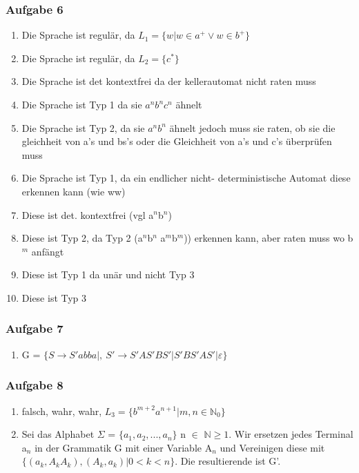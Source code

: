 \documentclass[12pt]{scrartcl}
\begin{document}
\subsubsection{Aufgabe 6}
	\begin{enumerate}
	
		\item Die Sprache ist regulär, da \(L_1 = \{w | w \in a^{+} \lor w \in b^{+} \} \)
		\item Die Sprache ist regulär, da \( L_2 = \{c^{*} \} \)
		\item Die Sprache ist det kontextfrei da der kellerautomat nicht raten muss 
		\item Die Sprache ist Typ 1 da sie \( a^{n} b^{n} c^{n} \) ähnelt
		\item Die Sprache ist Typ 2, da sie \(a^{n} b^{n} \) ähnelt jedoch muss sie raten, ob sie die gleichheit von a's und  bs's oder die Gleichheit von a's und c's überprüfen muss
		\item Die Sprache ist Typ 1, da ein endlicher nicht- deterministische Automat diese erkennen kann (wie ww)
		\item Diese ist det. kontextfrei (vgl a$^{n}$b$^{n}$)
		\item Diese ist Typ 2, da Typ 2 (a$^{n}$b$^{n}$ a$^{m}$b$^{m}$)) erkennen kann, aber raten muss wo b$^{m}$ anfängt
		\item Diese ist Typ 1 da unär und nicht Typ 3
		\item Diese ist Typ 3
	\end{enumerate}

\subsubsection{Aufgabe 7}
	\begin{enumerate}
		\item G = \(\{S \rightarrow S'abba | ,\ S' \rightarrow S'AS'BS'| S'BS'AS'|\varepsilon \}\)
	\end{enumerate}

\subsubsection{Aufgabe 8}
	\begin{enumerate}
		\item falsch, wahr, wahr, \(L_3=\{ b^{m+2} a^{n+1}| m,n \in \mathbb{N}_0 \}  \)
		\item Sei das Alphabet $\Sigma$ = \(\{a_1, a_2, ..., a_n  \}\) n $\in$ $\mathbb{N}\ge 1$. Wir ersetzen jedes Terminal a$_n$ in der Grammatik G mit einer Variable A$_n$ und Vereinigen diese mit\(\{ (a_k,A_k A_k),(A_k,a_k)| 0 < k < n \}\). Die resultierende ist G'.
	\end{enumerate}
	
\end{document}
